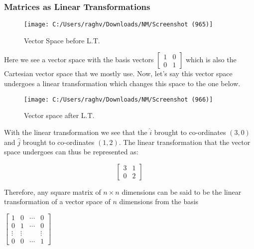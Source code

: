\documentclass{article}
\begin{document}
\subsubsection{Matrices as Linear Transformations}

\begin{figure}[h]
    \centering
    \texttt{[image: C:/Users/raghv/Downloads/NM/Screenshot (965)]}
    \caption{Vector Space before L.T.}
    \label{fig:image1}
  \end{figure}
  
    Here we see a vector space with the basis vectors 
    $
    \begin{bmatrix}
        1 & 0 \\ 0 & 1
    \end{bmatrix}
    $
    which is also the Cartesian vector space that we mostly use. Now, let's say this vector space undergoes a linear transformation which changes this space to the one below.

  
  \begin{figure}[h]
    \centering
    \texttt{[image: C:/Users/raghv/Downloads/NM/Screenshot (966)]}
    \caption{Vector space after L.T.}
    \label{fig:image2}
  \end{figure}
  
  With the linear transformation we see that the $\hat{i}$ brought to co-ordinates $(3,0)$ and $\hat{j}$ brought to co-ordinates $(1,2)$. The linear transformation that the vector space undergoes can thus be represented as:

  \[
    \begin{bmatrix}
        3 & 1 \\ 0 & 2
    \end{bmatrix}
  \]

  Therefore, any square matrix of $n \times n$ dimensions can be said to be the linear transformation of a vector space of $n$ dimensions from the basis 
  \begin{center}

    \begin{math}
        \begin{bmatrix}
            1 & 0 & \cdots & 0 \\ 
            0 & 1 & \cdots & 0 \\
            \vdots & \vdots & & \vdots \\
            0 & 0 & \cdots & 1 
        \end{bmatrix}
    \end{math}

\end{center}
\end{document}
